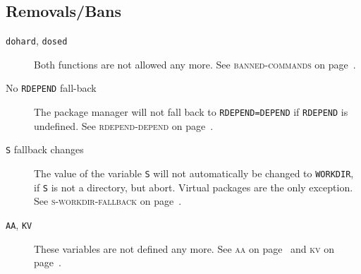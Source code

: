 \documentclass[a4paper]{leaflet}
\newcommand{\code}[1]{\texttt{#1}}
\newcommand{\featureref}[1]{\textsc{#1} on page~\pageref{feat:#1}}
\begin{document}
\subsection{Removals/Bans}
\label{sec:cs:eapi4-removalsbans}
\begin{description}
    \item[\code{dohard}, \code{dosed}] Both functions are not allowed
    any more.  See \featureref{banned-commands}.
    \item[No \code{RDEPEND} fall-back] The package manager will not
    fall back to \code{RDEPEND=DEPEND} if \code{RDEPEND} is undefined.
    See \featureref{rdepend-depend}.
    \item[\code{S} fallback changes] The value of the variable
    \code{S} will not automatically be changed to \code{WORKDIR}, if
    \code{S} is not a directory, but abort.  Virtual packages are the
    only exception.  See \featureref{s-workdir-fallback}.
    \item[\code{AA}, \code{KV}] These variables are not defined
    any more.  See \featureref{aa} and \featureref{kv}.
\end{description}
\end{document}
